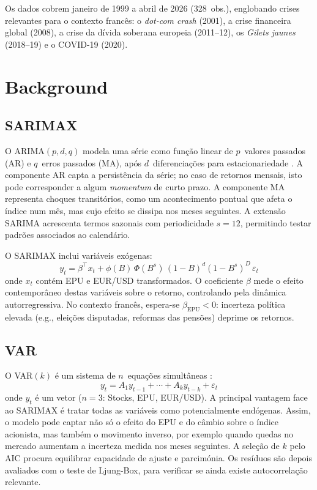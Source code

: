 \documentclass[12pt,a4paper]{article}
\begin{document}
Os dados cobrem janeiro de 1999 a abril de 2026 (328~obs.), englobando crises relevantes para o contexto francês: o \textit{dot-com crash} (2001), a crise financeira global (2008), a crise da dívida soberana europeia (2011--12), os \textit{Gilets jaunes} (2018--19) e o COVID-19 (2020).

\section{Background}

\subsection{SARIMAX}

O ARIMA$(p,d,q)$ modela uma série como função linear de $p$~valores passados (AR) e $q$~erros passados (MA), após $d$~diferenciações para estacionariedade \citep{box2015time}. A componente AR capta a persistência da série; no caso de retornos mensais, isto pode corresponder a algum \textit{momentum} de curto prazo. A componente MA representa choques transitórios, como um acontecimento pontual que afeta o índice num mês, mas cujo efeito se dissipa nos meses seguintes. A extensão SARIMA acrescenta termos sazonais com periodicidade $s{=}12$, permitindo testar padrões associados ao calendário.

O SARIMAX inclui variáveis exógenas:
\begin{equation}
y_t = \beta^\top x_t + \phi(B)\,\Phi(B^s)\,(1{-}B)^d(1{-}B^s)^D\,\varepsilon_t
\end{equation}
onde $x_t$ contém EPU e EUR/USD transformados. O coeficiente $\beta$ mede o efeito contemporâneo destas variáveis sobre o retorno, controlando pela dinâmica autorregressiva. No contexto francês, espera-se $\beta_{\text{EPU}} < 0$: incerteza política elevada (e.g., eleições disputadas, reformas das pensões) deprime os retornos.

\subsection{VAR}

O VAR$(k)$ é um sistema de $n$~equações simultâneas \citep{lutkepohl2005new}:
\begin{equation}
y_t = A_1 y_{t-1} + \cdots + A_k y_{t-k} + \varepsilon_t
\end{equation}
onde $y_t$ é um vetor ($n{=}3$: Stocks, EPU, EUR/USD). A principal vantagem face ao SARIMAX é tratar todas as variáveis como potencialmente endógenas. Assim, o modelo pode captar não só o efeito do EPU e do câmbio sobre o índice acionista, mas também o movimento inverso, por exemplo quando quedas no mercado aumentam a incerteza medida nos meses seguintes. A seleção de $k$ pelo AIC procura equilibrar capacidade de ajuste e parcimónia. Os resíduos são depois avaliados com o teste de Ljung-Box, para verificar se ainda existe autocorrelação relevante.
\end{document}
